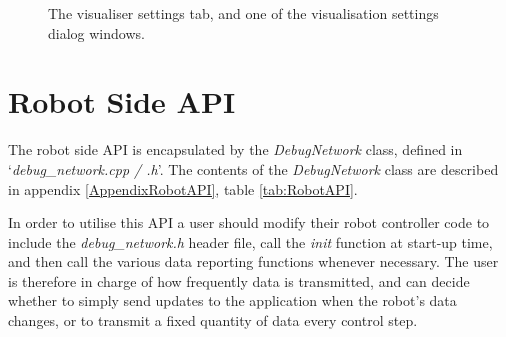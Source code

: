 \begin{figure}
 \centering
 \decoRule
 \caption[Visualiser Settings Tab]{The visualiser settings tab, and one of the visualisation settings dialog windows.}
 \label{fig:VisualiserSettingsTab}
\end{figure}


\section{Robot Side API} \label{RobotSide}
The robot side API is encapsulated by the \textit{DebugNetwork} class, defined in `\textit{debug\_network.cpp / .h}'. The contents of the \textit{DebugNetwork} class are described in appendix \ref{AppendixRobotAPI}, table \ref{tab:RobotAPI}.

In order to utilise this API a user should modify their robot controller code to include the \textit{debug\_network.h} header file, call the \textit{init} function at start-up time, and then call the various data reporting functions whenever necessary. The user is therefore in charge of how frequently data is transmitted, and can decide whether to simply send updates to the application when the robot's data changes, or to transmit a fixed quantity of data every control step.

